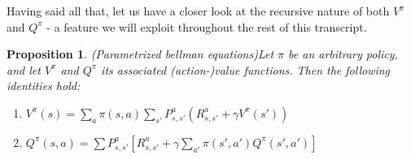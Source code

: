 \documentclass[11pt]{article} %
\newtheorem{prop}{Proposition}
\begin{document}
Having said all that, let us have a closer look at the recursive nature of both $V^{\pi}$ and $Q^{\pi}$ - a feature we will exploit throughout the rest of this transcript.

\begin{prop}{(Parametrized bellman equations)}\label{prop_paramBellmanEqs}
	Let $\pi$ be an arbitrary policy, and let $V^{\pi}$ and $Q^{\pi}$ its associated (action-)value functions. Then the following identities hold:
	\begin{enumerate}
		\item $V^{\pi}(s) = \sum_{a} \pi(s,a) \sum_{s'} P_{s,s'}^a ( R_{s,s'}^a + \gamma V^{\pi}(s') ) $
		\item $Q^{\pi}(s,a) = \sum P_{s,s'}^a [ R_{s,s'}^a + \gamma \sum_{a'} \pi(s',a') Q^{\pi}(s',a') ] $
	\end{enumerate}
\end{prop}
\end{document}
